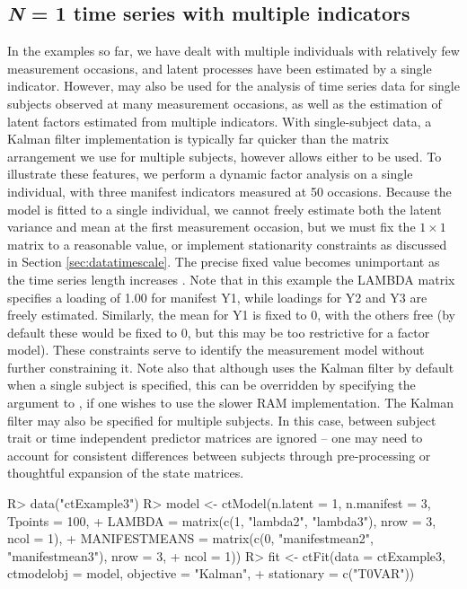 \documentclass[nojss]{jss}\usepackage[]{graphicx}\usepackage[]{color}
\begin{document}
\subsection[N = 1 Time series with multiple indicators]{\textit{N} = 1 time series with multiple indicators} \label{sec:timeseries}
In the examples so far, we have dealt with multiple individuals with relatively few measurement occasions, and latent processes have been estimated by a single indicator. However,  may also be used for the analysis of time series data for single subjects observed at many measurement occasions, as well as the estimation of latent factors estimated from multiple indicators. With single-subject data, a Kalman filter implementation is typically far quicker than the matrix arrangement we use for multiple subjects, however  allows either to be used.  To illustrate these features, we perform a dynamic factor analysis on a single individual, with three manifest indicators measured at 50 occasions. Because the model is fitted to a single individual, we cannot freely estimate both the latent variance and mean at the first measurement occasion, but we must fix the $1 \times 1$  matrix to a reasonable value, or implement stationarity constraints as discussed in Section \ref{sec:datatimescale}. The precise fixed value becomes unimportant as the time series length increases \citep{durbin2012time}. Note that in this example the LAMBDA matrix specifies a loading of 1.00 for manifest Y1, while loadings for Y2 and Y3 are freely estimated. Similarly, the mean for Y1 is fixed to 0, with the others free (by default these would be fixed to 0, but this may be too restrictive for a factor model). These constraints serve to identify the measurement model without further constraining it.  Note also that although  uses the Kalman filter by default when a single subject is specified, this can be overridden by specifying the  argument to , if one wishes to use the slower RAM implementation. The Kalman filter may also be specified for multiple subjects. In this case, between subject trait or time independent predictor matrices are ignored -- one may need to account for consistent differences between subjects through pre-processing or thoughtful expansion of the state matrices.

\begin{Schunk}
\begin{Sinput}
R> data("ctExample3")
R> model <- ctModel(n.latent = 1, n.manifest = 3, Tpoints = 100, 
+   LAMBDA = matrix(c(1, "lambda2", "lambda3"), nrow = 3, ncol = 1), 
+   MANIFESTMEANS = matrix(c(0, "manifestmean2", "manifestmean3"), nrow = 3, 
+     ncol = 1))
R> fit <- ctFit(data = ctExample3, ctmodelobj = model, objective = "Kalman",
+   stationary = c("T0VAR"))
\end{Sinput}
\end{Schunk}
\end{document}
